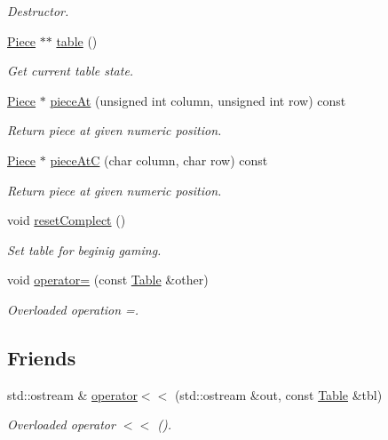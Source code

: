\begin{DoxyCompactItemize}
\begin{DoxyCompactList}\small\item\em Destructor. \item\end{DoxyCompactList}\item 
\hyperlink{classChEngn_1_1Piece}{Piece} $\ast$$\ast$ \hyperlink{classChEngn_1_1Table_a7e403087a7979907ca171e20462f8346}{table} ()
\begin{DoxyCompactList}\small\item\em Get current table state. \item\end{DoxyCompactList}\item 
\hyperlink{classChEngn_1_1Piece}{Piece} $\ast$ \hyperlink{classChEngn_1_1Table_a5f797f91cf61269b04d19ede97875ba4}{pieceAt} (unsigned int column, unsigned int row) const 
\begin{DoxyCompactList}\small\item\em Return piece at given numeric position. \item\end{DoxyCompactList}\item 
\hyperlink{classChEngn_1_1Piece}{Piece} $\ast$ \hyperlink{classChEngn_1_1Table_a715d819b37f5cb853209ac36d06c8a89}{pieceAtC} (char column, char row) const 
\begin{DoxyCompactList}\small\item\em Return piece at given numeric position. \item\end{DoxyCompactList}\item 
void \hyperlink{classChEngn_1_1Table_a8ece9e9f9f28f209d72f16db0fb2aeed}{resetComplect} ()
\begin{DoxyCompactList}\small\item\em Set table for beginig gaming. \item\end{DoxyCompactList}\item 
void \hyperlink{classChEngn_1_1Table_a5b45cb67e40f75358145826e72b319b4}{operator=} (const \hyperlink{classChEngn_1_1Table}{Table} \&other)
\begin{DoxyCompactList}\small\item\em Overloaded operation =. \item\end{DoxyCompactList}\end{DoxyCompactItemize}
\subsection*{Friends}
\begin{DoxyCompactItemize}
\item 
std::ostream \& \hyperlink{classChEngn_1_1Table_a9a39b79ad3a5635dfe8075f14598886e}{operator$<$$<$} (std::ostream \&out, const \hyperlink{classChEngn_1_1Table}{Table} \&tbl)
\begin{DoxyCompactList}\small\item\em Overloaded operator $<$$<$ (). \item\end{DoxyCompactList}\end{DoxyCompactItemize}


